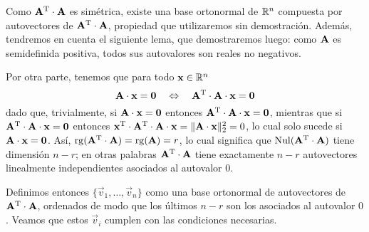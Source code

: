 Como $\mathbf{A}^{\mathrm{T}} \cdot \mathbf{A}$ es simétrica, existe una base ortonormal de
$\mathbb{R}^n$ compuesta por autovectores de $\mathbf{A}^{\mathrm{T}} \cdot \mathbf{A}$,
propiedad que utilizaremos sin demostración.
Además, tendremos en cuenta el siguiente lema, que demostraremos luego:
como $\mathbf{A}$ es semidefinida positiva,
todos sus autovalores son reales no negativos.

Por otra parte, tenemos que para todo $\mathbf{x} \in \mathbb{R}^n$
\[ \mathbf{A} \cdot \mathbf{x} = \mathbf{0} \quad \Leftrightarrow \quad
    \mathbf{A}^{\mathrm{T}} \cdot \mathbf{A} \cdot \mathbf{x} = \mathbf{0} \]
dado que, trivialmente, si $\mathbf{A} \cdot \mathbf{x} = \mathbf{0}$ entonces
$\mathbf{A}^{\mathrm{T}} \cdot \mathbf{A} \cdot \mathbf{x} = \mathbf{0}$, mientras que si
$\mathbf{A}^{\mathrm{T}} \cdot \mathbf{A} \cdot \mathbf{x} = \mathbf{0}$ entonces
$\mathbf{x}^{\mathrm{T}} \cdot \mathbf{A}^{\mathrm{T}} \cdot \mathbf{A} \cdot \mathbf{x}
    = \lVert \mathbf{A} \cdot \mathbf{x} \rVert_2^2 = 0$, lo cual solo sucede si
$\mathbf{A} \cdot \mathbf{x} = \mathbf{0}$.
Así, $\operatorname{rg}(\mathbf{A}^{\mathrm{T}} \cdot \mathbf{A}) = \operatorname{rg}(\mathbf{A}) = r$, lo cual significa
que $\operatorname{Nul}(\mathbf{A}^{\mathrm{T}} \cdot \mathbf{A})$ tiene dimensión $n-r$; en otras
palabras $\mathbf{A}^{\mathrm{T}} \cdot \mathbf{A}$ tiene exactamente $n - r$ autovectores
linealmente independientes asociados al autovalor $0$.

Definimos entonces $\lbrace \vec{v}_1, \dots, \vec{v}_n \rbrace$ como una base
ortonormal de autovectores de $\mathbf{A}^{\mathrm{T}} \cdot \mathbf{A}$, ordenados de modo
que los últimos $n-r$ son los asociados al autovalor $0$.
Veamos que estos $\vec{v}_i$ cumplen con las condiciones necesarias.

